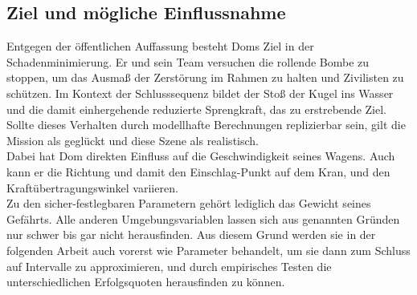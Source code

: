 
\subsection{Ziel und mögliche Einflussnahme}
Entgegen der öffentlichen Auffassung besteht Doms Ziel in der Schadenminimierung. Er und sein Team versuchen die rollende Bombe zu stoppen, um das Ausmaß der Zerstörung im Rahmen zu halten und Zivilisten zu schützen. 
Im Kontext der Schlusssequenz bildet der Stoß der Kugel ins Wasser und die damit einhergehende reduzierte Sprengkraft, das zu erstrebende Ziel. 
Sollte dieses Verhalten durch modellhafte Berechnungen replizierbar sein, gilt die Mission als geglückt und diese Szene als realistisch. 
\\
Dabei hat Dom direkten Einfluss auf die Geschwindigkeit seines Wagens. Auch kann er die Richtung und damit den Einschlag-Punkt auf dem Kran, und den Kraftübertragungswinkel variieren. 
\\
Zu den sicher-festlegbaren Parametern gehört lediglich das Gewicht seines Gefährts. Alle anderen Umgebungsvariablen lassen sich aus genannten Gründen nur schwer bis gar nicht herausfinden. Aus diesem Grund werden sie in der folgenden Arbeit auch vorerst wie Parameter behandelt, um sie dann zum Schluss auf Intervalle zu approximieren, und durch empirisches Testen die unterschiedlichen Erfolgsquoten herausfinden zu können.

